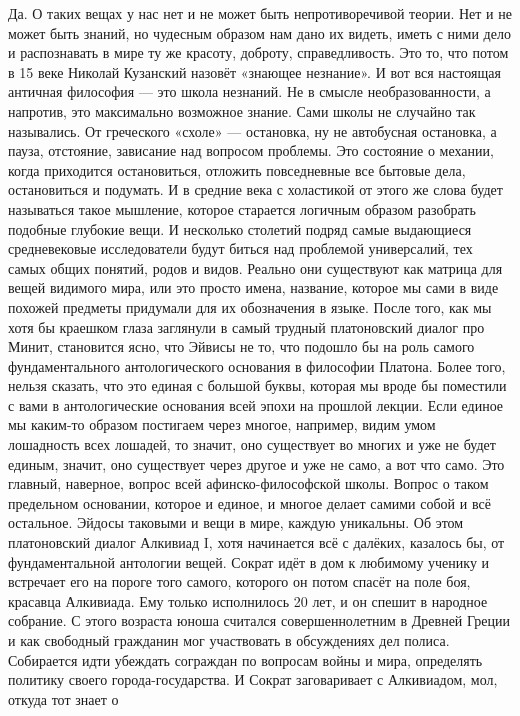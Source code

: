 Да. О таких вещах у нас нет и не может быть непротиворечивой теории. Нет и не
может быть знаний, но чудесным образом нам дано их видеть, иметь с ними дело и
распознавать в мире ту же красоту, доброту, справедливость. Это то, что потом в
15 веке Николай Кузанский назовёт «знающее незнание». И вот вся настоящая
античная философия — это школа незнаний. Не в смысле необразованности, а
напротив, это максимально возможное знание. Сами школы не случайно так
назывались. От греческого «схоле» — остановка, ну не автобусная остановка, а
пауза, отстояние, зависание над вопросом проблемы. Это состояние о механии,
когда приходится остановиться, отложить повседневные все бытовые дела,
остановиться и подумать. И в средние века с холастикой от этого же слова будет
называться такое мышление, которое старается логичным образом разобрать подобные
глубокие вещи. И несколько столетий подряд самые выдающиеся средневековые
исследователи будут биться над проблемой универсалий, тех самых общих понятий,
родов и видов. Реально они существуют как матрица для вещей видимого мира, или
это просто имена, название, которое мы сами в виде похожей предметы придумали
для их обозначения в языке. После того, как мы хотя бы краешком глаза заглянули
в самый трудный платоновский диалог про Минит, становится ясно, что Эйвисы не
то, что подошло бы на роль самого фундаментального антологического основания в
философии Платона. Более того, нельзя сказать, что это единая с большой буквы,
которая мы вроде бы поместили с вами в антологические основания всей эпохи на
прошлой лекции. Если единое мы каким-то образом постигаем через многое,
например, видим умом лошадность всех лошадей, то значит, оно существует во
многих и уже не будет единым, значит, оно существует через другое и уже не само,
а вот что само. Это главный, наверное, вопрос всей афинско-философской школы.
Вопрос о таком предельном основании, которое и единое, и многое делает самими
собой и всё остальное. Эйдосы таковыми и вещи в мире, каждую уникальны. Об этом
платоновский диалог Алкивиад I, хотя начинается всё с далёких, казалось бы, от
фундаментальной антологии вещей. Сократ идёт в дом к любимому ученику и
встречает его на пороге того самого, которого он потом спасёт на поле боя,
красавца Алкивиада. Ему только исполнилось 20 лет, и он спешит в народное
собрание. С этого возраста юноша считался совершеннолетним в Древней Греции и
как свободный гражданин мог участвовать в обсуждениях дел полиса. Собирается
идти убеждать сограждан по вопросам войны и мира, определять политику своего
города-государства. И Сократ заговаривает с Алкивиадом, мол, откуда тот знает о
